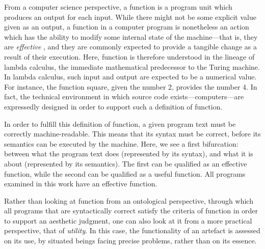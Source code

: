 From a computer science perspective, a function is a program unit which produces an output for each input. While there might not be some explicit value given as an output, a function in a computer program is nonetheless an action which has the ability to modify some internal state of the machine—that is, they are \emph{effective} \citep{abelson_structure_1979}, and they are commonly expected to provide a tangible change as a result of their execution. Here, function is therefore understood in the lineage of lambda calculus, the immediate mathematical predecessor to the Turing machine. In lambda calculus, such input and output are expected to be a numerical value. For instance, the function square, given the number 2, provides the number 4. In fact, the technical environment in which source code exists—computers—are expressedly designed in order to support such a definition of function.

In order to fulfill this definition of function, a given program text must be correctly machine-readable. This means that its syntax must be correct, before its semantics can be executed by the machine. Here, we see a first bifurcation: between what the program text does (represented by its syntax), and what it is about (represented by its semantics). The first can be qualified as an effective function, while the second can be qualified as a useful function. All programs examined in this work have an effective function.

Rather than looking at function from an ontological perspective, through which all programs that are syntactically correct satisfy the criteria of function in order to support an aesthetic judgment, one can also look at it from a more practical perspective, that of \emph{utility}. In this case, the functionality of an artefact is assessed on its use, by situated beings facing precise problems, rather than on its essence.

